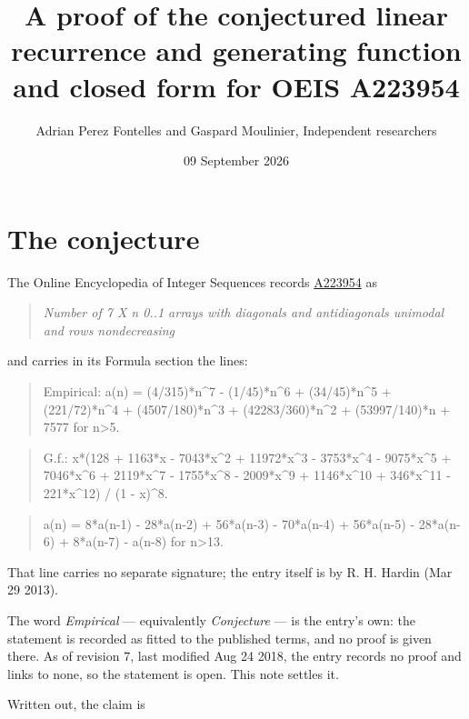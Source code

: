\documentclass[11pt]{article}
\title{A proof of the conjectured linear recurrence and generating function and closed form for OEIS A223954}
\author{Adrian Perez Fontelles and Gaspard Moulinier, Independent researchers}
\date{09 September 2026}
\theoremstyle{definition}
\begin{document}
\maketitle
\section{The conjecture}

The Online Encyclopedia of Integer Sequences records \href{https://oeis.org/A223954}{A223954} as

\begin{quote}\itshape Number of 7 X n 0..1 arrays with diagonals and antidiagonals unimodal and rows nondecreasing\end{quote}

and carries in its Formula section the lines:

\begin{quote}\ttfamily Empirical: a(n) = (4/315)*n\textasciicircum{}7 - (1/45)*n\textasciicircum{}6 + (34/45)*n\textasciicircum{}5 + (221/72)*n\textasciicircum{}4 + (4507/180)*n\textasciicircum{}3 + (42283/360)*n\textasciicircum{}2 + (53997/140)*n + 7577 for n>5.\end{quote}

\begin{quote}\ttfamily G.f.: x*(128 + 1163*x - 7043*x\textasciicircum{}2 + 11972*x\textasciicircum{}3 - 3753*x\textasciicircum{}4 - 9075*x\textasciicircum{}5 + 7046*x\textasciicircum{}6 + 2119*x\textasciicircum{}7 - 1755*x\textasciicircum{}8 - 2009*x\textasciicircum{}9 + 1146*x\textasciicircum{}10 + 346*x\textasciicircum{}11 - 221*x\textasciicircum{}12) / (1 - x)\textasciicircum{}8.\end{quote}

\begin{quote}\ttfamily a(n) = 8*a(n-1) - 28*a(n-2) + 56*a(n-3) - 70*a(n-4) + 56*a(n-5) - 28*a(n-6) + 8*a(n-7) - a(n-8) for n>13.\end{quote}

That line carries no separate signature; the entry itself is by R. H. Hardin (Mar 29 2013).

The word {\itshape Empirical} --- equivalently {\itshape Conjecture} --- is the entry's own: the statement is recorded as fitted to the published terms, and no proof is given there. As of revision 7, last modified Aug 24 2018, the entry records no proof and links to none, so the statement is open. This note settles it.

Written out, the claim is
\end{document}
